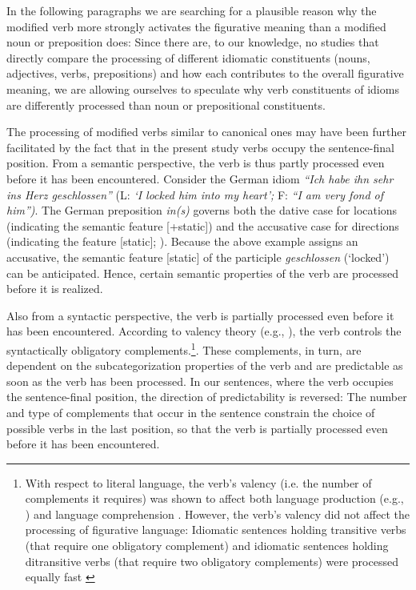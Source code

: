 \documentclass[output=paper]{langsci/langscibook}
\begin{document}
In the following paragraphs we are searching for a plausible reason why the modified verb more strongly activates the figurative meaning than a modified noun or preposition does: Since there are, to our knowledge, no studies that directly compare the processing of different idiomatic constituents (nouns, adjectives, verbs, prepositions) and how each contributes to the overall figurative meaning, we are allowing ourselves to speculate why verb constituents of idioms are differently processed than noun or prepositional constituents. 

The processing of modified verbs similar to canonical ones may have been further facilitated by the fact that in the present study verbs occupy the sentence-final position.  From a semantic perspective, the verb is thus partly processed even before it has been encountered.  Consider the German idiom \textit{``Ich habe ihn sehr ins Herz geschlossen''} (L: \textit{`I locked him into my heart';} F: \textit{``I am very fond of him'')}. The German preposition \textit{in(s)} governs both the dative case for locations (indicating the semantic feature [+static]) and the accusative case for directions (indicating the feature [\textendash static]; \citealt{gansel:1992}). Because the above example assigns an accusative, the semantic feature [\textendash static] of the participle \textit{geschlossen} (‘locked’) can be anticipated. Hence, certain semantic properties of the verb are processed before it is realized.

Also from a syntactic perspective, the verb is partially processed even before it has been encountered. According to valency theory (e.g., \citealt{tesniere:1959}), the verb controls the syntactically obligatory complements.\footnote{With respect to literal language, the verb’s valency (i.e. the number of complements it requires) was shown to affect both language production (e.g., \citealt{thompson:1997}) and language comprehension \citep{shapiro:1987}. However, the verb’s valency did not affect the processing of figurative language: Idiomatic sentences holding transitive verbs (that require one obligatory complement) and idiomatic sentences holding ditransitive verbs (that require two obligatory complements) were processed equally fast \citep{dorrestars}}. These complements, in turn, are dependent on the subcategorization properties of the verb and are predictable as soon as the verb has been processed. In our sentences, where the verb occupies the sentence-final position, the direction of predictability is reversed: The number and type of complements that occur in the sentence constrain the choice of possible verbs in the last position, so that the verb is partially processed even before it has been encountered.
\end{document}

